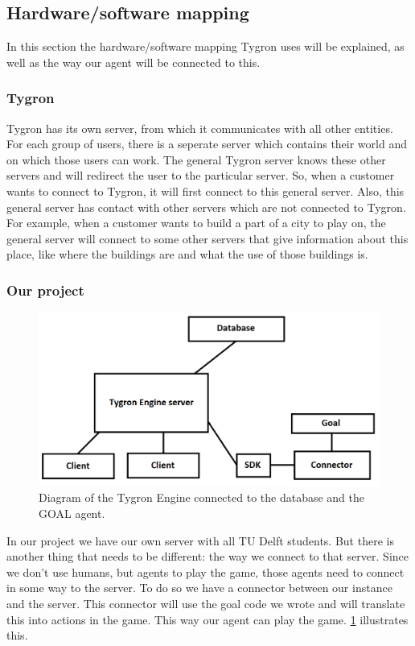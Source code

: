 \newpage
\subsection{Hardware/software mapping}
In this section the hardware/software mapping Tygron uses will be explained, as well as the way our agent will be connected to this.

\subsubsection{Tygron}
Tygron has its own server, from which it communicates with all other entities. For each group of users, there is a seperate server which contains their world and on which those users can work. The general Tygron server knows these other servers and will redirect the user to the particular server. So, when a customer wants to connect to Tygron, it will first connect to this general server. Also, this general server has contact with other servers which are not connected to Tygron. For example, when a customer wants to build a part of a city to play on, the general server will connect to some other servers that give information about this place, like where the buildings are and what the use of those buildings is. 

\subsubsection{Our project}
\begin{figure}[h!]
  \centering
  \includegraphics[scale=0.35]{Tygrondatabase.png}
  \caption{Diagram of the Tygron Engine connected to the database and the GOAL agent.}
  \label{fig:tygron2}
\end{figure}
In our project we have our own server with all TU Delft students. But there is another thing that needs to be different: the way we connect to that server. Since we don't use humans, but agents to play the game, those agents need to connect in some way to the server. To do so we have a connector between our instance and the server. This connector will use the goal code we wrote and will translate this into actions in the game. This way our agent can play the game. \ref{fig:tygron2} illustrates this.

